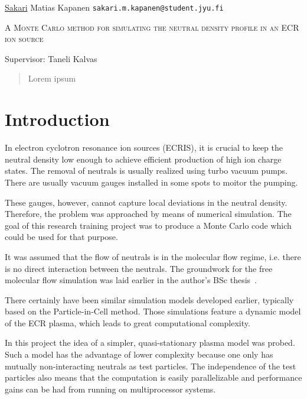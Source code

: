 \documentclass[a4paper,twoside,12pt]{article}
\begin{document}
\onehalfspacing%
\thispagestyle{empty}
\begin{flushleft}
 \underline{Sakari} Matias Kapanen\hfill
 \texttt{sakari.m.kapanen@student.jyu.fi}
\end{flushleft}
\vfill
\begin{center}
\textsc{\LARGE A Monte Carlo method for simulating the neutral density profile in an ECR ion source}
\end{center}
\vfill
Supervisor: Taneli Kalvas\\
\vfill
\begin{abstract}
 \noindent
    Lorem ipsum
\end{abstract}
\clearpage%

\setlength{\parindent}{0pt}
\setlength{\parskip}{12pt}

\setcounter{page}{1}

\section{Introduction}
In electron cyclotron resonance ion sources (ECRIS), it is crucial to keep the neutral density low enough to achieve efficient production of high ion charge states. The removal of neutrals is usually realized using turbo vacuum pumps. There are usually vacuum gauges installed in some spots to moitor the pumping.

These gauges, however, cannot capture local deviations in the neutral density. Therefore, the problem was approached by means of numerical simulation. The goal of this research training project was to produce a Monte Carlo code which could be used for that purpose.

It was assumed that the flow of neutrals is in the molecular flow regime, i.e. there is no direct interaction between the neutrals. The groundwork for the free molecular flow simulation was laid earlier in the author's BSc thesis~\cite{kapanen:bsc}.

There certainly have been similar simulation models developed earlier, typically based on the Particle-in-Cell method. Those simulations feature a dynamic model of the ECR plasma, which leads to great computational complexity.

In this project the idea of a simpler, quasi-stationary plasma model was probed. Such a model has the advantage of lower complexity because one only has mutually non-interacting neutrals as test particles. The independence of the test particles also means that the computation is easily parallelizable and performance gains can be had from running on multiprocessor systems.
\end{document}
